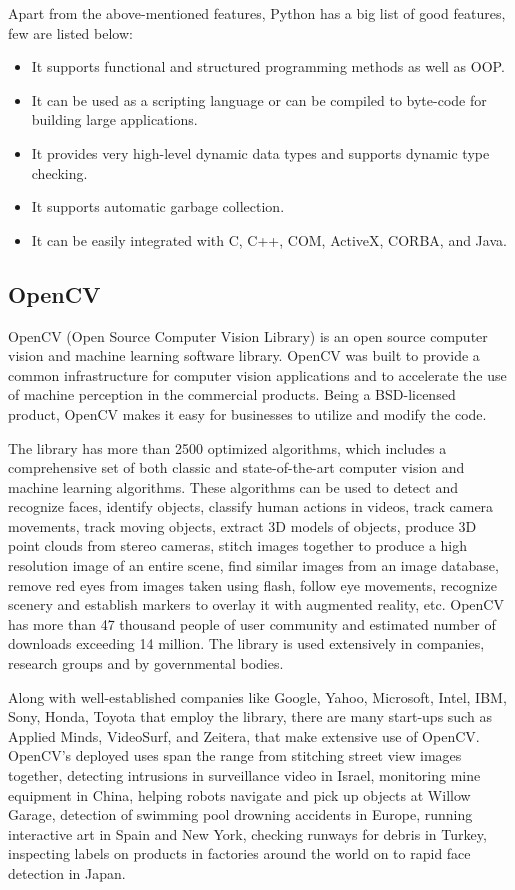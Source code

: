 Apart from the above-mentioned features, Python has a big list of good features, few are listed below:
\begin{itemize}
	\item It supports functional and structured programming methods as well as OOP.
\item It can be used as a scripting language or can be compiled to byte-code for building large applications.
\item It provides very high-level dynamic data types and supports dynamic type checking.
\item It supports automatic garbage collection.
\item It can be easily integrated with C, C++, COM, ActiveX, CORBA, and Java.

\end{itemize}
\subsection{OpenCV}
OpenCV (Open Source Computer Vision Library) is an open source computer vision and machine learning software library. OpenCV was built to provide a common infrastructure for computer vision applications and to accelerate the use of machine perception in the commercial products. Being a BSD-licensed product, OpenCV makes it easy for businesses to utilize and modify the code.\par
The library has more than 2500 optimized algorithms, which includes a comprehensive set of both classic and state-of-the-art computer vision and machine learning algorithms. These algorithms can be used to detect and recognize faces, identify objects, classify human actions in videos, track camera movements, track moving objects, extract 3D models of objects, produce 3D point clouds from stereo cameras, stitch images together to produce a high resolution image of an entire scene, find similar images from an image database, remove red eyes from images taken using flash, follow eye movements, recognize scenery and establish markers to overlay it with augmented reality, etc. OpenCV has more than 47 thousand people of user community and estimated number of downloads exceeding 14 million. The library is used extensively in companies, research groups and by governmental bodies.\par
Along with well-established companies like Google, Yahoo, Microsoft, Intel, IBM, Sony, Honda, Toyota that employ the library, there are many start-ups such as Applied Minds, VideoSurf, and Zeitera, that make extensive use of OpenCV. OpenCV’s deployed uses span the range from stitching street view images together, detecting intrusions in surveillance video in Israel, monitoring mine equipment in China, helping robots navigate and pick up objects at Willow Garage, detection of swimming pool drowning accidents in Europe, running interactive art in Spain and New York, checking runways for debris in Turkey, inspecting labels on products in factories around the world on to rapid face detection in Japan.\par
